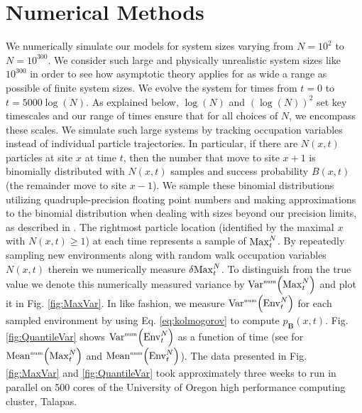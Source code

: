 \section{Numerical Methods}
We numerically simulate our models for system sizes varying from $N=10^2$ to $N=10^{300}$. We consider such large and physically unrealistic system sizes like $10^{300}$ in order to see how asymptotic theory applies for as wide a  range as possible of finite system sizes. We evolve the system for times from $t=0$ to $t= 5000 \log(N)$.  As explained below, $\log(N)$ and $(\log(N))^2$ set key timescales and our range of times ensure that for all choices of $N$, we encompass these scales. We simulate such large systems by tracking occupation variables instead of individual particle trajectories. In particular, if there are $N(x,t)$ particles at site $x$ at time $t$, then the number that move to site $x+1$ is binomially distributed with $N(x,t)$ samples and success probability $B(x,t)$ (the remainder move to site $x-1$). We sample these binomial distributions utilizing quadruple-precision floating point numbers and making approximations to the binomial distribution when dealing with sizes beyond our precision limits, as described in \cite{SeeSupplementalMaterial}. The rightmost particle location (identified by the maximal $x$ with $N(x,t)\geq 1$) at each time represents a sample of $\mathrm{Max}^{N}_t$. By repeatedly sampling new environments along with random walk occupation variables $N(x,t)$ therein we numerically measure $\var{\mathrm{Max}^{N}_t}$. To distinguish from the true value we denote this numerically measured variance by $\mathrm{Var}^{\textrm{\tiny{num}}}\!\left(\mathrm{Max}^{N}_t\right)$ and plot it in Fig. \ref{fig:MaxVar}. In like fashion, we measure $\mathrm{Var}^{\textrm{\tiny{num}}}\!\left(\mathrm{Env}^{N}_t\right)$ for each sampled environment by using Eq. \ref{eq:kolmogorov} to compute $p_{\mathbf{B}}(x,t)$.  Fig. \ref{fig:QuantileVar} shows $\mathrm{Var}^{\textrm{\tiny{num}}}\!\left(\mathrm{Env}^{N}_t\right)$ as a function of time (see \cite{SeeSupplementalMaterial} for $\mathrm{Mean}^{\textrm{\tiny{num}}}\!\left(\mathrm{Max}^{N}_t\right)$ and $\mathrm{Mean}^{\textrm{\tiny{num}}}\!\left(\mathrm{Env}^{N}_t\right)$). The data presented in Fig. \ref{fig:MaxVar} and \ref{fig:QuantileVar} took approximately three weeks to run in parallel on 500 cores of the University of Oregon high performance computing cluster, Talapas.


